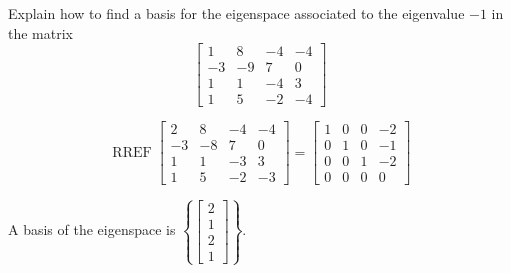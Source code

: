 
\begin{exerciseStatement}


Explain how to find a basis for the eigenspace associated to the eigenvalue \( -1 \) in the matrix \[ \left[\begin{array}{cccc}
1 & 8 & -4 & -4 \\
-3 & -9 & 7 & 0 \\
1 & 1 & -4 & 3 \\
1 & 5 & -2 & -4
\end{array}\right] \]


\end{exerciseStatement}
    
\begin{exerciseAnswer} 


\[\operatorname{RREF} \left[\begin{array}{cccc}
2 & 8 & -4 & -4 \\
-3 & -8 & 7 & 0 \\
1 & 1 & -3 & 3 \\
1 & 5 & -2 & -3
\end{array}\right] = \left[\begin{array}{cccc}
1 & 0 & 0 & -2 \\
0 & 1 & 0 & -1 \\
0 & 0 & 1 & -2 \\
0 & 0 & 0 & 0
\end{array}\right] \]



A basis of the eigenspace is \( \left\{ \left[\begin{array}{c}
2 \\
1 \\
2 \\
1
\end{array}\right] \right\} \).


\end{exerciseAnswer}
    
